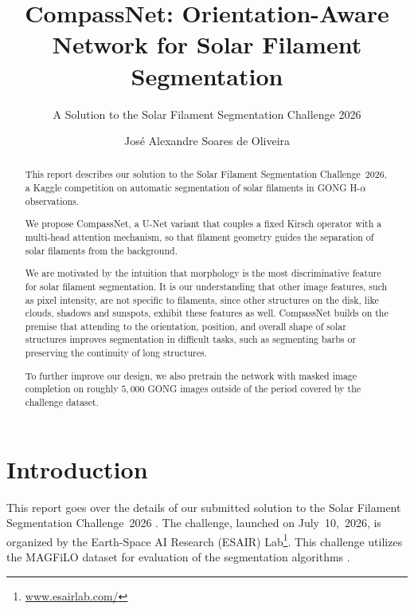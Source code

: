 \documentclass[sigconf]{acmart}
\begin{document}
\title{CompassNet: Orientation-Aware Network for Solar Filament Segmentation}

\subtitle{A Solution to the Solar Filament Segmentation Challenge 2026}

\author{José Alexandre Soares de Oliveira}



\begin{abstract}
    This report describes our solution to the Solar Filament Segmentation Challenge~2026, a Kaggle competition on automatic segmentation of solar filaments in GONG H-$\alpha$ observations. 

    We propose CompassNet, a U-Net variant that couples a fixed Kirsch operator with a multi-head attention mechanism, so that filament geometry guides the separation of solar filaments from the background.
    
    We are motivated by the intuition that morphology is the most discriminative feature for solar filament segmentation. It is our understanding that other image features, such as pixel intensity, are not specific to filaments, since other structures on the disk, like clouds, shadows and sunspots, exhibit these features as well. CompassNet builds on the premise that attending to the orientation, position, and overall shape of solar structures improves segmentation in difficult tasks, such as segmenting barbs or preserving the continuity of long structures.
    
    To further improve our design, we also pretrain the network with masked image completion on roughly $5{,}000$ GONG images outside of the period covered by the challenge dataset.
\end{abstract}

\maketitle

\section{Introduction}
    This report goes over the details of our submitted solution to the Solar Filament Segmentation Challenge~2026 \cite{filament-segmentation-2026}. The challenge, launched on July~10,~2026, is organized by the Earth-Space AI Research (ESAIR) Lab\footnote{\href{https://www.esairlab.com/home}{www.esairlab.com/}}. This challenge utilizes the MAGFiLO dataset for evaluation of the segmentation algorithms \cite{ahmadzadeh2024dataset}. 
\end{document}
